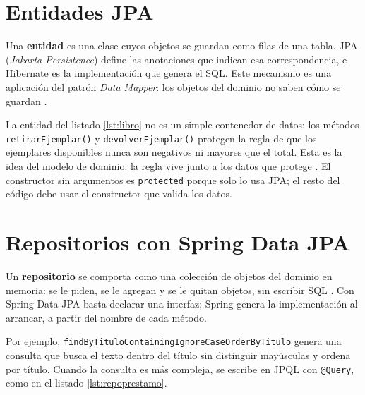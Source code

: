 \section{Entidades JPA}

Una \textbf{entidad} es una clase cuyos objetos se guardan como filas de una tabla. JPA (\emph{Jakarta Persistence}) define las anotaciones que indican esa correspondencia, e Hibernate es la implementación que genera el SQL. Este mecanismo es una aplicación del patrón \emph{Data Mapper}: los objetos del dominio no saben cómo se guardan \cite{fowler2002patterns}.



La entidad del listado \ref{lst:libro} no es un simple contenedor de datos: los métodos \texttt{retirarEjemplar()} y \texttt{devolverEjemplar()} protegen la regla de que los ejemplares disponibles nunca son negativos ni mayores que el total. Esta es la idea del modelo de dominio: la regla vive junto a los datos que protege \cite{fowler2002patterns,evans2003domain}. El constructor sin argumentos es \texttt{protected} porque solo lo usa JPA; el resto del código debe usar el constructor que valida los datos.

\section{Repositorios con Spring Data JPA}

Un \textbf{repositorio} se comporta como una colección de objetos del dominio en memoria: se le piden, se le agregan y se le quitan objetos, sin escribir SQL \cite{fowler2002patterns,evans2003domain}. Con Spring Data JPA basta declarar una interfaz; Spring genera la implementación al arrancar, a partir del nombre de cada método.



Por ejemplo, \texttt{findByTituloContainingIgnoreCaseOrderByTitulo} genera una consulta que busca el texto dentro del título sin distinguir mayúsculas y ordena por título. Cuando la consulta es más compleja, se escribe en JPQL con \texttt{@Query}, como en el listado \ref{lst:repoprestamo}.



